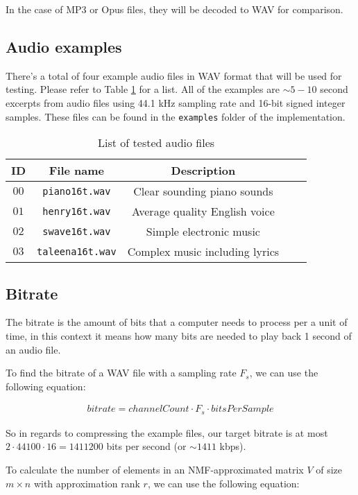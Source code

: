 In the case of MP3 or Opus files, they will be decoded to WAV for comparison.

\subsection{Audio examples}
There's a total of four example audio files in WAV format that will be used for testing. Please refer to Table \ref{tab:audio_examples} for a list. All of the examples are $\sim5-10$ second excerpts from audio files using 44.1 kHz sampling rate and 16-bit signed integer samples. These files can be found in the \verb|examples| folder of the implementation.

\begin{table}[htbp]\caption{List of tested audio files}
	\label{tab:audio_examples}
	\centering
	\begin{tabular}{|c|c|c|c|l|}
		\hline
		ID & File name & Description \\ \hline
		$00$ & \verb|piano16t.wav| & Clear sounding piano sounds \\
		$01$ & \verb|henry16t.wav| & Average quality English voice \\
		$02$ & \verb|swave16t.wav| & Simple electronic music \\
		$03$ & \verb|taleena16t.wav| & Complex music including lyrics \\
		\hline
	\end{tabular}
\end{table}

\subsection{Bitrate}
The bitrate is the amount of bits that a computer needs to process per a unit of time, in this context it means how many bits are needed to play back 1 second of an audio file.

To find the bitrate of a WAV file with a sampling rate $F_s$, we can use the following equation:

\begin{align}
bitrate = channelCount \cdot F_s \cdot bitsPerSample
\end{align}

So in regards to compressing the example files, our target bitrate is at most $2 \cdot 44100 \cdot 16 = 1411200$ bits per second (or $\sim 1411$ kbps).

To calculate the number of elements in an NMF-approximated matrix $V$ of size $m \times n$ with approximation rank $r$, we can use the following equation:

